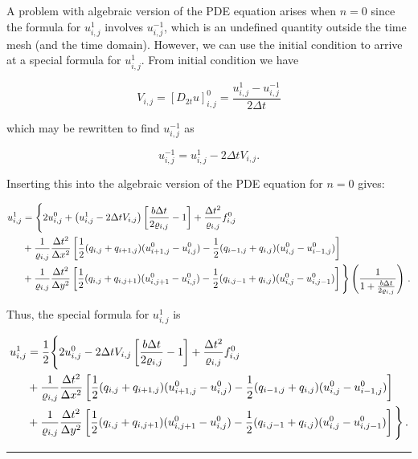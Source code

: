 \documentclass[letterpaper,10pt,english]{/usr/share/sphinx/texinputs/sphinxhowto}
\begin{document}
A problem with algebraic version of the PDE equation arises when $n=0$
since the formula for $u^1_{i,j}$ involves $u^{-1}_{i,j}$, which is an
undefined quantity outside the time mesh (and the time domain). However,
we can use the initial condition to arrive at a special formula for
$u^1_{i,j}$. From initial condition we have

\[ V_{i,j} = [D_{2t} u]_{i,j}^0 = \frac{u_{i,j}^{1} - u_{i,j}^{-1}}{2\Delta t} \]

which may be rewritten to find $u_{i,j}^{-1}$ as

\[
 u^{-1}_{i,j} =u^1_{i,j} -  2\Delta t V_{i,j}.
\]

Inserting this into the algebraic version of the PDE equation for $n=0$
gives:

\begin{align*}u^{1}_{i,j} &= 
\Bigg\{
2u^{0}_{i,j} + \left( u^1_{i,j} -  2\Delta t V_{i,j} \right)\left[\frac{b \Delta t}{2\varrho_{i,j}} - 1\right]+\frac{\Delta t^2}{\varrho_{i,j}} f^0_{i,j} \\
&+ \frac{1}{\varrho_{i,j}}\frac{\Delta t^2}{\Delta x^2} 
\left[ \frac{1}{2}(q_{i,j} + q_{i+1,j})(u^{0}_{i+1,j} - u^{0}_{i,j}) - \frac{1}{2}(q_{i-1,j} + q_{i,j})(u^{0}_{i,j} - u^{0}_{i-1,j})\right] \\
&+ \frac{1}{\varrho_{i,j}}\frac{\Delta t^2}{\Delta y^2} 
\left[ \frac{1}{2}(q_{i,j} + q_{i,j+1})(u^{0}_{i,j+1} - u^{0}_{i,j}) -\frac{1}{2}(q_{i,j-1} + q_{i,j})(u^{0}_{i,j} - u^{0}_{i,j-1})\right]
\Bigg\} \left(\frac{1}{1+ \frac{b\Delta t}{2\varrho_{i,j} }}\right )
\thinspace .\end{align*}

Thus, the special formula for $u^1_{i,j}$ is

\begin{align*}
u^{1}_{i,j} &= 
\frac{1}{2}\Bigg\{
2u^{0}_{i,j}  -  2\Delta t V_{i,j} \left[\frac{b \Delta t}{2\varrho_{i,j}} - 1\right]+\frac{\Delta t^2}{\varrho_{i,j}} f^0_{i,j} \\
&+ \frac{1}{\varrho_{i,j}}\frac{\Delta t^2}{\Delta x^2} 
\left[ \frac{1}{2}(q_{i,j} + q_{i+1,j})(u^{0}_{i+1,j} - u^{0}_{i,j}) - \frac{1}{2}(q_{i-1,j} + q_{i,j})(u^{0}_{i,j} - u^{0}_{i-1,j})\right] \\
&+ \frac{1}{\varrho_{i,j}}\frac{\Delta t^2}{\Delta y^2} 
\left[ \frac{1}{2}(q_{i,j} + q_{i,j+1})(u^{0}_{i,j+1} - u^{0}_{i,j}) -\frac{1}{2}(q_{i,j-1} + q_{i,j})(u^{0}_{i,j} - u^{0}_{i,j-1})\right]
\Bigg\}
\thinspace .\end{align*}\begin{center}\rule{3in}{0.4pt}\end{center}
\end{document}

